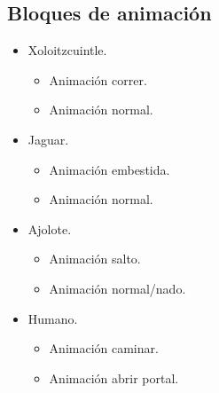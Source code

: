 \subsection{Bloques de animación}
\begin{itemize}
	\item Xoloitzcuintle.
			\begin{itemize}
				\item Animación correr.
				\item Animación normal. 
		\end{itemize}	
	\item Jaguar.
		\begin{itemize}
				\item Animación embestida.
				\item Animación normal. 
		\end{itemize}
	\item Ajolote.
		\begin{itemize}
				\item Animación salto.
				\item Animación normal/nado.
		\end{itemize}	
	\item Humano.
		\begin{itemize}
				\item Animación caminar.
				\item Animación abrir portal.  
		\end{itemize}
\end{itemize}